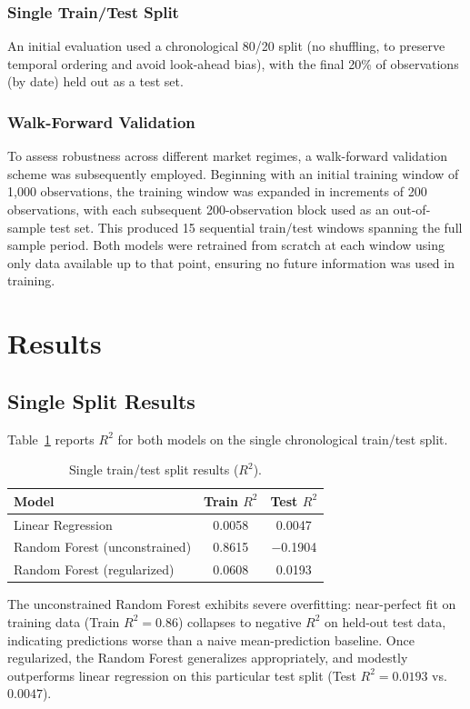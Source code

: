 \documentclass[11pt]{article}
\begin{document}
\subsubsection{Single Train/Test Split}
An initial evaluation used a chronological 80/20 split (no shuffling, to preserve temporal ordering and avoid look-ahead bias), with the final 20\% of observations (by date) held out as a test set.

\subsubsection{Walk-Forward Validation}
To assess robustness across different market regimes, a walk-forward validation scheme was subsequently employed. Beginning with an initial training window of 1{,}000 observations, the training window was expanded in increments of 200 observations, with each subsequent 200-observation block used as an out-of-sample test set. This produced 15 sequential train/test windows spanning the full sample period. Both models were retrained from scratch at each window using only data available up to that point, ensuring no future information was used in training.

\section{Results}

\subsection{Single Split Results}
Table~\ref{tab:single_split} reports $R^2$ for both models on the single chronological train/test split.

\begin{table}[h]
\centering
\begin{tabular}{lcc}
\toprule
Model & Train $R^2$ & Test $R^2$ \\
\midrule
Linear Regression & 0.0058 & 0.0047 \\
Random Forest (unconstrained) & 0.8615 & $-$0.1904 \\
Random Forest (regularized) & 0.0608 & 0.0193 \\
\bottomrule
\end{tabular}
\caption{Single train/test split results ($R^2$).}
\label{tab:single_split}
\end{table}

The unconstrained Random Forest exhibits severe overfitting: near-perfect fit on training data (Train $R^2 = 0.86$) collapses to negative $R^2$ on held-out test data, indicating predictions worse than a naive mean-prediction baseline. Once regularized, the Random Forest generalizes appropriately, and modestly outperforms linear regression on this particular test split (Test $R^2 = 0.0193$ vs.\ $0.0047$).
\end{document}
